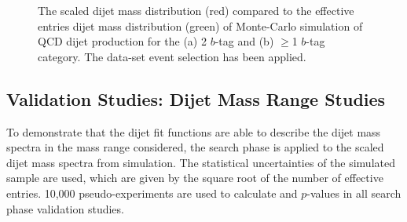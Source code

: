 \begin{figure}[!ht]
  \begin{center}
    \captionsetup[subfigure]{aboveskip=0pt,justification=centering}
  \end{center}
  \caption{The scaled dijet mass distribution (red) compared to the
    effective entries dijet mass distribution (green)
    of Monte-Carlo simulation of QCD dijet production for the (a) 2 $b$-tag and (b) $\geq$1 $b$-tag category.
    The \summer{} data-set event selection has been applied.}
  \label{fig:effEnt}
\end{figure}

\subsection{Validation Studies: Dijet Mass Range Studies}
\label{sec:bkg-summer_range}

To demonstrate that the dijet fit functions are able to describe the dijet mass spectra in the mass range considered,
the search phase is applied to the scaled dijet mass spectra from simulation.
The statistical uncertainties of the simulated sample are used,
which are given by the square root of the number of effective entries.
10,000 pseudo-experiments are used to calculate \bh{} and \dhunt{} $p$-values in all \summer{} search phase validation studies.

